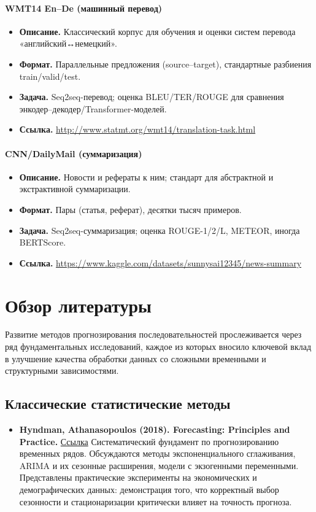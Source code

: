 \documentclass[12pt,a4paper]{article}
\begin{document}
\paragraph{WMT14 En--De (машинный перевод)}
\begin{itemize}
  \item \textbf{Описание.} Классический корпус для обучения и оценки систем перевода «английский↔немецкий».
  \item \textbf{Формат.} Параллельные предложения (source--target), стандартные разбиения train/valid/test.
  \item \textbf{Задача.} Seq2seq-перевод; оценка BLEU/TER/ROUGE для сравнения энкодер--декодер/Transformer-моделей.
  \item \textbf{Ссылка.} \href{http://www.statmt.org/wmt14/translation-task.html}{http://www.statmt.org/wmt14/translation-task.html}
\end{itemize}

\paragraph{CNN/DailyMail (суммаризация)}
\begin{itemize}
  \item \textbf{Описание.} Новости и рефераты к ним; стандарт для абстрактной и экстрактивной суммаризации.
  \item \textbf{Формат.} Пары (статья, реферат), десятки тысяч примеров.
  \item \textbf{Задача.} Seq2seq-суммаризация; оценка ROUGE-1/2/L, METEOR, иногда BERTScore.
  \item \textbf{Ссылка.} \href{https://www.kaggle.com/datasets/sunnysai12345/news-summary}{https://www.kaggle.com/datasets/sunnysai12345/news-summary}
\end{itemize}


\section{Обзор литературы}

Развитие методов прогнозирования последовательностей прослеживается через ряд фундаментальных исследований, каждое из которых вносило ключевой вклад в улучшение качества обработки данных со сложными временными и структурными зависимостями.

\subsection{Классические статистические методы}
\begin{itemize}
  \item \textbf{Hyndman, Athanasopoulos (2018). Forecasting: Principles and Practice.}
  \href{https://otexts.com/fpp3/}{Ссылка}
  Систематический фундамент по прогнозированию временных рядов. Обсуждаются методы экспоненциального сглаживания, ARIMA и их сезонные расширения, модели с экзогенными переменными.
  Представлены практические эксперименты на экономических и демографических данных: демонстрация того, что корректный выбор сезонности и стационаризации критически влияет на точность прогноза.
\end{itemize}
\end{document}
